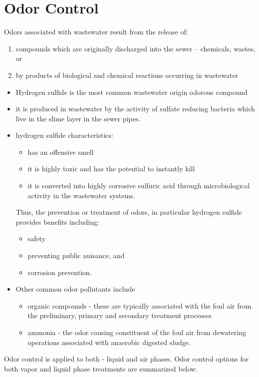 
\chapter{Odor Control}





Odors associated with wastewater result from the release of:\\
\begin{enumerate}
\item compounds which are originally discharged into the sewer – chemicals, wastes, or 
\item by products of biological and chemical reactions occurring in wastewater
\end{enumerate}

\begin{itemize}
	\item Hydrogen sulfide is the most common wastewater origin odorous compound
	\item it is produced in wastewater by the activity of sulfate reducing bacteria which live in the slime layer in the sewer pipes.  
	\item hydrogen sulfide characteristics:
	\begin{itemize}
		\item has an offensive smell
		\item it is highly toxic and has the potential to instantly kill  
		\item it is converted into highly corrosive sulfuric acid through microbiological activity in the wastewater systems.  
	\end{itemize}
Thus, the prevention or treatment of odors, in particular hydrogen sulfide provides benefits including:
	\begin{itemize}
		\item safety
		\item preventing public nuisance, and
		\item  corrosion prevention.\\
	\end{itemize}
\vspace{0.5cm}
\item Other common odor pollutants include
\begin{itemize}
\item organic compounds - these are typically associated with the foul air from the preliminary, primary and secondary treatment processes
\item ammonia - the odor causing constituent of the foul air from dewatering operations associated with anaerobic digested sludge.\\
\end{itemize}
\end{itemize}
\vspace{0.5cm}
Odor control is applied to both - liquid and air phases. Odor control options for both vapor and liquid phase treatments are summarized below.

